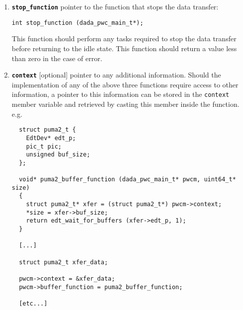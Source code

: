 \begin{enumerate}
\item {\bf {\tt stop\_function}} pointer to the function that stops
  the data transfer:
\begin{verbatim}
int stop_function (dada_pwc_main_t*);
\end{verbatim}
  This function should perform any tasks required to stop the data
  transfer before returning to the idle state.  This function should return
  a value less than zero in the case of error.

\item {\bf {\tt context}} [optional] pointer to any additional information.
  Should the implementation of any of the above three functions
  require access to other information, a pointer to this information
  can be stored in the {\tt context} member variable and retrieved by
  casting this member inside the function. e.g.
\begin{verbatim}
  struct puma2_t {
    EdtDev* edt_p;
    pic_t pic;
    unsigned buf_size;
  };

  void* puma2_buffer_function (dada_pwc_main_t* pwcm, uint64_t* size)
  {
    struct puma2_t* xfer = (struct puma2_t*) pwcm->context;
    *size = xfer->buf_size;
    return edt_wait_for_buffers (xfer->edt_p, 1);
  }

  [...]

  struct puma2_t xfer_data;

  pwcm->context = &xfer_data;
  pwcm->buffer_function = puma2_buffer_function;

  [etc...]
\end{verbatim}

\end{enumerate}
